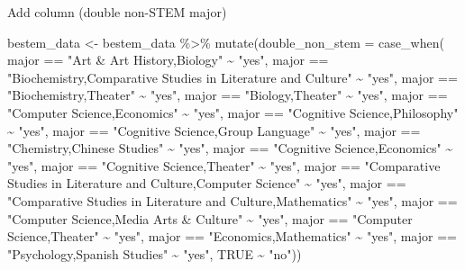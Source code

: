 \documentclass[
]{article}
\newenvironment{Shaded}{\begin{snugshade}}{\end{snugshade}}
\newcommand{\AttributeTok}[1]{\textcolor[rgb]{0.77,0.63,0.00}{#1}}
\newcommand{\ConstantTok}[1]{\textcolor[rgb]{0.00,0.00,0.00}{#1}}
\newcommand{\FunctionTok}[1]{\textcolor[rgb]{0.00,0.00,0.00}{#1}}
\newcommand{\NormalTok}[1]{#1}
\newcommand{\OtherTok}[1]{\textcolor[rgb]{0.56,0.35,0.01}{#1}}
\newcommand{\SpecialCharTok}[1]{\textcolor[rgb]{0.00,0.00,0.00}{#1}}
\newcommand{\StringTok}[1]{\textcolor[rgb]{0.31,0.60,0.02}{#1}}
\begin{document}
Add column (double non-STEM major)

\begin{Shaded}
\begin{Highlighting}[]
\NormalTok{bestem\_data }\OtherTok{\textless{}{-}}\NormalTok{ bestem\_data }\SpecialCharTok{\%\textgreater{}\%} 
  \FunctionTok{mutate}\NormalTok{(}\AttributeTok{double\_non\_stem =} \FunctionTok{case\_when}\NormalTok{(}
\NormalTok{    major }\SpecialCharTok{==} \StringTok{"Art \& Art History,Biology"} \SpecialCharTok{\textasciitilde{}} \StringTok{"yes"}\NormalTok{,}
\NormalTok{    major }\SpecialCharTok{==} \StringTok{"Biochemistry,Comparative Studies in Literature and Culture"} \SpecialCharTok{\textasciitilde{}} \StringTok{"yes"}\NormalTok{,}
\NormalTok{    major }\SpecialCharTok{==} \StringTok{"Biochemistry,Theater"} \SpecialCharTok{\textasciitilde{}} \StringTok{"yes"}\NormalTok{,}
\NormalTok{    major }\SpecialCharTok{==} \StringTok{"Biology,Theater"} \SpecialCharTok{\textasciitilde{}} \StringTok{"yes"}\NormalTok{,}
\NormalTok{    major }\SpecialCharTok{==} \StringTok{"Computer Science,Economics"} \SpecialCharTok{\textasciitilde{}} \StringTok{"yes"}\NormalTok{,}
\NormalTok{    major }\SpecialCharTok{==} \StringTok{"Cognitive Science,Philosophy"} \SpecialCharTok{\textasciitilde{}} \StringTok{"yes"}\NormalTok{,}
\NormalTok{    major }\SpecialCharTok{==} \StringTok{"Cognitive Science,Group Language"} \SpecialCharTok{\textasciitilde{}} \StringTok{"yes"}\NormalTok{,}
\NormalTok{    major }\SpecialCharTok{==} \StringTok{"Chemistry,Chinese Studies"} \SpecialCharTok{\textasciitilde{}} \StringTok{"yes"}\NormalTok{,}
\NormalTok{    major }\SpecialCharTok{==} \StringTok{"Cognitive Science,Economics"} \SpecialCharTok{\textasciitilde{}} \StringTok{"yes"}\NormalTok{,}
\NormalTok{    major }\SpecialCharTok{==} \StringTok{"Cognitive Science,Theater"} \SpecialCharTok{\textasciitilde{}} \StringTok{"yes"}\NormalTok{,}
\NormalTok{    major }\SpecialCharTok{==} \StringTok{"Comparative Studies in Literature and Culture,Computer Science"} \SpecialCharTok{\textasciitilde{}} \StringTok{"yes"}\NormalTok{,}
\NormalTok{    major }\SpecialCharTok{==} \StringTok{"Comparative Studies in Literature and Culture,Mathematics"} \SpecialCharTok{\textasciitilde{}} \StringTok{"yes"}\NormalTok{,}
\NormalTok{    major }\SpecialCharTok{==} \StringTok{"Computer Science,Media Arts \& Culture"} \SpecialCharTok{\textasciitilde{}} \StringTok{"yes"}\NormalTok{,}
\NormalTok{    major }\SpecialCharTok{==} \StringTok{"Computer Science,Theater"} \SpecialCharTok{\textasciitilde{}} \StringTok{"yes"}\NormalTok{,}
\NormalTok{    major }\SpecialCharTok{==} \StringTok{"Economics,Mathematics"} \SpecialCharTok{\textasciitilde{}} \StringTok{"yes"}\NormalTok{,}
\NormalTok{    major }\SpecialCharTok{==} \StringTok{"Psychology,Spanish Studies"} \SpecialCharTok{\textasciitilde{}} \StringTok{"yes"}\NormalTok{,}
    \ConstantTok{TRUE} \SpecialCharTok{\textasciitilde{}} \StringTok{"no"}\NormalTok{))}
\end{Highlighting}
\end{Shaded}
\end{document}
